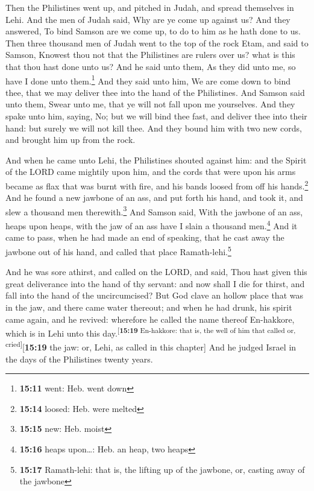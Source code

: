  Then the Philistines went up, and pitched in Judah, and
spread themselves in Lehi.  And the men of Judah said,
Why are ye come up against us? And they answered, To bind Samson are we
come up, to do to him as he hath done to us.  Then three
thousand men of Judah went to the top of the rock Etam, and said to
Samson, Knowest thou not that the Philistines are rulers over us? what
is this that thou hast done unto us? And he said unto them, As they did
unto me, so have I done unto them.\footnote{\textbf{15:11} went: Heb.
  went down}  And they said unto him, We are come down to
bind thee, that we may deliver thee into the hand of the Philistines.
And Samson said unto them, Swear unto me, that ye will not fall upon me
yourselves.  And they spake unto him, saying, No; but we
will bind thee fast, and deliver thee into their hand: but surely we
will not kill thee. And they bound him with two new cords, and brought
him up from the rock.

 And when he came unto Lehi, the Philistines shouted
against him: and the Spirit of the LORD came mightily upon him, and the
cords that were upon his arms became as flax that was burnt with fire,
and his bands loosed from off his hands.\footnote{\textbf{15:14} loosed:
  Heb. were melted}  And he found a new jawbone of an
ass, and put forth his hand, and took it, and slew a thousand men
therewith.\footnote{\textbf{15:15} new: Heb. moist}  And
Samson said, With the jawbone of an ass, heaps upon heaps, with the jaw
of an ass have I slain a thousand men.\footnote{\textbf{15:16} heaps
  upon\ldots: Heb. an heap, two heaps}  And it came to
pass, when he had made an end of speaking, that he cast away the jawbone
out of his hand, and called that place Ramath-lehi.\footnote{\textbf{15:17}
  Ramath-lehi: that is, the lifting up of the jawbone, or, casting away
  of the jawbone}

 And he was sore athirst, and called on the LORD, and
said, Thou hast given this great deliverance into the hand of thy
servant: and now shall I die for thirst, and fall into the hand of the
uncircumcised?  But God clave an hollow place that was in
the jaw, and there came water thereout; and when he had drunk, his
spirit came again, and he revived: wherefore he called the name thereof
En-hakkore, which is in Lehi unto this
day.\textsuperscript{{[}\textbf{15:19} En-hakkore: that is, the well of
him that called or, cried{]}}{[}\textbf{15:19} the jaw: or, Lehi, as
called in this chapter{]}  And he judged Israel in the
days of the Philistines twenty years.

